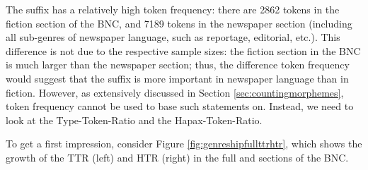 The suffix has a relatively high token frequency: there are 2862 tokens in the fiction section of the BNC, and 7189 tokens in the newspaper section (including all sub-genres of newspaper language, such as reportage, editorial, etc.). This difference is not due to the respective sample sizes: the fiction section in the BNC is much larger than the newspaper section; thus, the difference token frequency would suggest that the suffix is more important in newspaper language than in fiction. However, as extensively discussed in Section \ref{sec:countingmorphemes}, token frequency cannot be used to base such statements on. Instead, we need to look at the Type-Token-Ratio and the Hapax-Token-Ratio.

To get a first impression, consider Figure \ref{fig:genreshipfullttrhtr}, which shows the growth of the TTR (left) and HTR (right) in the full  and  sections of the BNC. 

